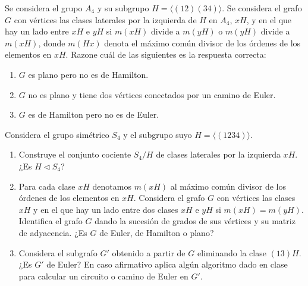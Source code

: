 \begin{ejercicio}\label{ej:1.38}
    Se considera el grupo $A_4$ y su subgrupo $H = \langle (1 2)(3 4) \rangle$. Se considera el grafo $G$ con vértices las clases laterales por la izquierda de $H$ en $A_4$, $xH$, y en el que hay un lado entre $xH$ e $yH$ si $m(xH)$ divide a $m(yH)$ o $m(yH)$ divide a $m(xH)$, donde $m(Hx)$ denota el máximo común divisor de los órdenes de los elementos en $xH$.
    Razone cuál de las siguientes es la respuesta correcta:
    \begin{enumerate}
        \item $G$ es plano pero no es de Hamilton.
        \item $G$ no es plano y tiene dos vértices conectados por un camino de Euler.
        \item $G$ es de Hamilton pero no es de Euler.
    \end{enumerate}
\end{ejercicio}


\begin{ejercicio}\label{ej:1.39}
    Considera el grupo simétrico $S_4$ y el subgrupo suyo $H = \langle (1 2 3 4) \rangle$.
    \begin{enumerate}
        \item Construye el conjunto cociente $S_4/H$ de clases laterales por la izquierda $xH$. ¿Es $H \triangleleft S_4$?
        \item Para cada clase $xH$ denotamos $m(xH)$ al máximo común divisor de los órdenes de los elementos en $xH$. Considera el grafo $G$ con vértices las clases $xH$ y en el que hay un lado entre dos clases $xH$ e $yH$ si $m(xH) = m(yH)$. Identifica el grafo $G$ dando la sucesión de grados de sus vértices y su matriz de adyacencia. ¿Es $G$ de Euler, de Hamilton o plano?
        \item Considera el subgrafo $G'$ obtenido a partir de $G$ eliminando la clase $(1 3)H$. ¿Es $G'$ de Euler? En caso afirmativo aplica algún algoritmo dado en clase para calcular un circuito o camino de Euler en $G'$.
    \end{enumerate}
\end{ejercicio}


